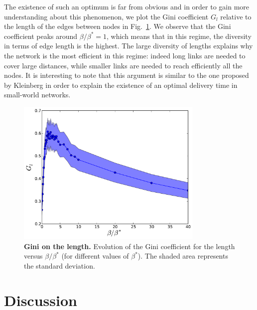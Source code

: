 The existence of such an optimum is far from obvious and in order to gain more
understanding about this phenomenon, we plot the Gini coefficient $G_l$ relative
to the length of the edges between nodes in Fig.~\ref{fig:gini_length}. We
observe that the Gini coefficient peaks around $\beta/\beta^* = 1$, which means
that in this regime, the diversity in terms of edge length is the highest. The
large diversity of lengths explains why the network is the most efficient in
this regime: indeed long links are needed to cover large distances, while
smaller links are needed to reach efficiently all the nodes. It is interesting
to note that this argument is similar to the one proposed by Kleinberg
\cite{Kleinberg:2000} in order to explain the existence of an optimal delivery
time in small-world networks.

\begin{figure}
    \centering
    \includegraphics[width=0.8\textwidth]{gfx/chapter-networks/figure9.pdf}
    \caption{{\bf Gini on the length.} Evolution of the Gini coefficient for the length versus $\beta/\beta^*$ (for different values of $\beta^*$). The shaded area represents the standard deviation. \label{fig:gini_length}}
\end{figure}


\section{Discussion}


